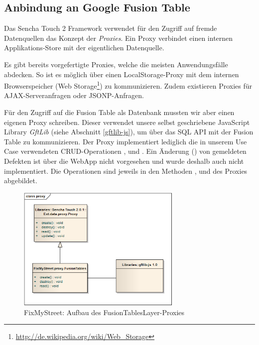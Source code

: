 \subsection{Anbindung an Google Fusion Table}
\label{fixmystreet-proxy}
Das Sencha Touch 2 Framework verwendet für den Zugriff auf fremde Datenquellen das Konzept der \emph{Proxies}. Ein Proxy verbindet einen internen Applikations-Store mit der eigentlichen Datenquelle.

Es gibt bereits vorgefertigte Proxies, welche die meisten Anwendungsfälle abdecken. So ist es möglich über einen LocalStorage-Proxy mit dem internen Browserspeicher (Web Storage\footnote{\url{http://de.wikipedia.org/wiki/Web_Storage}}) zu kommunizieren. Zudem existieren Proxies für \gls{AJAX}-Serveranfragen oder \gls{JSONP}-Anfragen.

Für den Zugriff auf die Fusion Table als Datenbank mussten wir aber einen eigenen Proxy schreiben. Dieser verwendet unsere selbst geschriebene JavaScript Library \emph{GftLib} (siehe Abschnitt \ref{gftlib-js}), um über das SQL \gls{API} mit der Fusion Table zu kommunizieren.
Der Proxy implementiert lediglich die in unserem Use Case verwendeten \gls{CRUD}-Operationen ,  und . Ein Änderung () von gemeldeten Defekten ist über die \gls{WebApp} nicht vorgesehen und wurde deshalb auch nicht implementiert.
Die Operationen sind jeweils in den Methoden ,  und  des Proxies abgebildet.

\begin{figure}[H]
	\centering
	\includegraphics[width=0.7\textwidth]{images/usecase2-fixmystreet/uml/fixmystreet-proxy-classmodel}
	\caption{FixMyStreet: Aufbau des FusionTablesLayer-Proxies}
	\label{fixmystreet-proxy-classmodel}
\end{figure}

